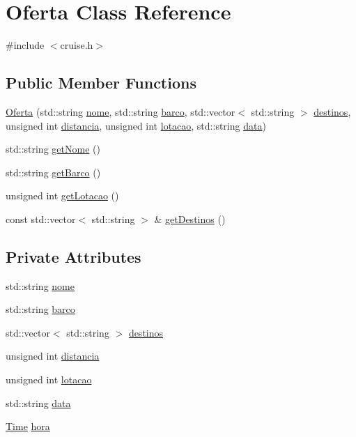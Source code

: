 \hypertarget{classOferta}{}\section{Oferta Class Reference}
\label{classOferta}


{\ttfamily \#include $<$cruise.\+h$>$}

\subsection*{Public Member Functions}
\begin{DoxyCompactItemize}
\item 
\hyperlink{classOferta_a152ccaa1645e7999f89f896174c9cc03}{Oferta} (std\+::string \hyperlink{classOferta_a84d1eec05559808c0d16527b33933092}{nome}, std\+::string \hyperlink{classOferta_ad41ed0bfb0e04d5f2f315fcd67350576}{barco}, std\+::vector$<$ std\+::string $>$ \hyperlink{classOferta_a8a1ca9c0a12da61db9b26aa0ab2a90c0}{destinos}, unsigned int \hyperlink{classOferta_a92003853fc238eef3f413ae0cb5afee2}{distancia}, unsigned int \hyperlink{classOferta_a3c0e19313190b4d9dc10e68e3cf33a5e}{lotacao}, std\+::string \hyperlink{classOferta_aa34296a79fd23afe52cd02916edf077b}{data})
\item 
std\+::string \hyperlink{classOferta_a16da38d9f369b000cb544c34200707b8}{get\+Nome} ()
\item 
std\+::string \hyperlink{classOferta_aaed9b5937f9f33d2980fcc13ac02132c}{get\+Barco} ()
\item 
unsigned int \hyperlink{classOferta_a9c8fbec401e54e590828209931bf25b0}{get\+Lotacao} ()
\item 
const std\+::vector$<$ std\+::string $>$ \& \hyperlink{classOferta_a746c91e5db19098d211a3f6bde2ec8ec}{get\+Destinos} ()
\end{DoxyCompactItemize}
\subsection*{Private Attributes}
\begin{DoxyCompactItemize}
\item 
std\+::string \hyperlink{classOferta_a84d1eec05559808c0d16527b33933092}{nome}
\item 
std\+::string \hyperlink{classOferta_ad41ed0bfb0e04d5f2f315fcd67350576}{barco}
\item 
std\+::vector$<$ std\+::string $>$ \hyperlink{classOferta_a8a1ca9c0a12da61db9b26aa0ab2a90c0}{destinos}
\item 
unsigned int \hyperlink{classOferta_a92003853fc238eef3f413ae0cb5afee2}{distancia}
\item 
unsigned int \hyperlink{classOferta_a3c0e19313190b4d9dc10e68e3cf33a5e}{lotacao}
\item 
std\+::string \hyperlink{classOferta_aa34296a79fd23afe52cd02916edf077b}{data}
\item 
\hyperlink{classTime}{Time} \hyperlink{classOferta_a1d9e20f1469e64c02eb2ba314f025589}{hora}
\end{DoxyCompactItemize}


